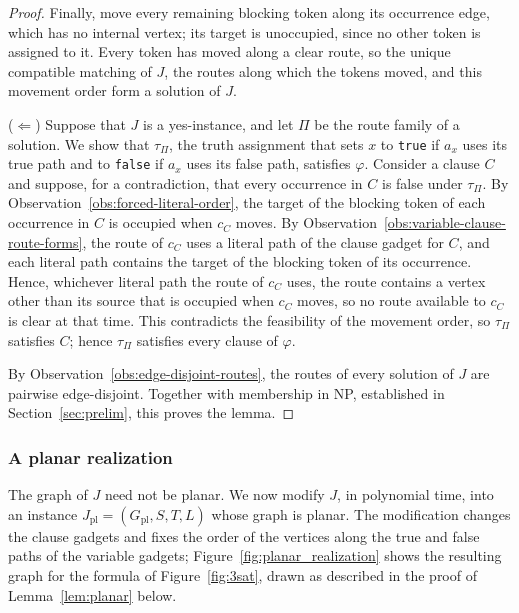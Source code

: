 \documentclass[a4paper,USenglish,thm-restate]{lipics-v2021}
\theoremstyle{problemstyle}
\begin{document}
\begin{proof}
Finally, move every remaining blocking token along its occurrence edge,
which has no internal vertex; its target is unoccupied, since no other token
is assigned to it. Every token has moved along a clear route, so the unique
compatible matching of $J$, the routes along which the tokens moved, and
this movement order form a solution of $J$.

\smallskip
\noindent
($\Leftarrow$)
Suppose that $J$ is a yes-instance, and let $\Pi$ be the route family of a
solution. We show that $\tau_\Pi$, the truth assignment that sets $x$ to
\texttt{true} if $a_x$ uses its true path and to \texttt{false} if $a_x$
uses its false path, satisfies $\varphi$. Consider a clause $C$
and suppose, for a contradiction, that every occurrence in $C$ is false under
$\tau_\Pi$. By Observation~\ref{obs:forced-literal-order}, the target of the
blocking token of each occurrence in $C$ is occupied when $c_C$ moves. By
Observation~\ref{obs:variable-clause-route-forms}, the route of $c_C$ uses a
literal path of the clause gadget for $C$, and each literal path contains
the target of the blocking token of its occurrence. Hence, whichever literal
path the route of $c_C$ uses, the route contains a vertex other than its
source that is occupied when $c_C$ moves, so no route available to $c_C$ is
clear at that time. This contradicts the feasibility of the movement order,
so $\tau_\Pi$ satisfies $C$; hence $\tau_\Pi$ satisfies every clause of
$\varphi$.

By Observation~\ref{obs:edge-disjoint-routes}, the routes of every solution
of $J$ are pairwise edge-disjoint. Together with membership in \textsf{NP},
established in Section~\ref{sec:prelim}, this proves the lemma.
\end{proof}

\subsubsection{A planar realization}
\label{sec:planar-realization}

The graph of $J$ need not be planar. We now modify $J$, in polynomial time,
into an instance $J_{\mathrm{pl}}=(G_{\mathrm{pl}},S,T,L)$ whose graph is
planar. The modification changes the clause gadgets and fixes the order of
the vertices along the true and false paths of the variable gadgets;
Figure~\ref{fig:planar_realization} shows the resulting graph for the
formula of Figure~\ref{fig:3sat}, drawn as described in the proof of
Lemma~\ref{lem:planar} below.
\end{document}
